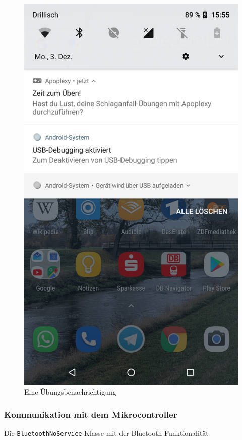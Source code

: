 \begin{multicols}{2}
\begin{figure}[H]
	\includegraphics[scale=0.1]{pics/device-notification.png}
	\caption{Eine Übungsbenachrichtigung}
\end{figure}
\end{multicols}

\tocless\subsubsection{Kommunikation mit dem Mikrocontroller}
\begin{longlisting}
	\caption{Die \texttt{BluetoothNoService}-Klasse mit der Bluetooth-Funktionalität}
	\label{listing:bluetooth}
\end{longlisting}

